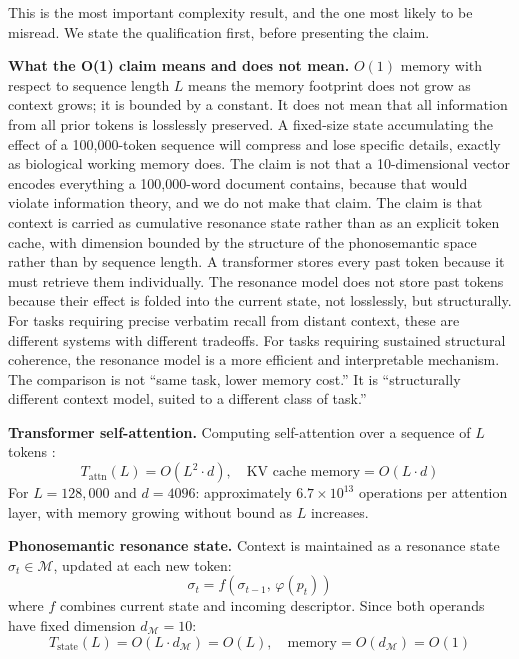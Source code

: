 \documentclass[12pt]{article}
\begin{document}
This is the most important complexity result, and the one most likely to be misread. We state the qualification first, before presenting the claim.

\textbf{What the O(1) claim means and does not mean.} $O(1)$ memory with respect to sequence length $L$ means the memory footprint does not grow as context grows; it is bounded by a constant. It does not mean that all information from all prior tokens is losslessly preserved. A fixed-size state accumulating the effect of a 100,000-token sequence will compress and lose specific details, exactly as biological working memory does. The claim is not that a 10-dimensional vector encodes everything a 100,000-word document contains, because that would violate information theory, and we do not make that claim. The claim is that context is carried as cumulative resonance state rather than as an explicit token cache, with dimension bounded by the structure of the phonosemantic space rather than by sequence length. A transformer stores every past token because it must retrieve them individually. The resonance model does not store past tokens because their effect is folded into the current state, not losslessly, but structurally. For tasks requiring precise verbatim recall from distant context, these are different systems with different tradeoffs. For tasks requiring sustained structural coherence, the resonance model is a more efficient and interpretable mechanism. The comparison is not ``same task, lower memory cost.'' It is ``structurally different context model, suited to a different class of task.''

\textbf{Transformer self-attention.}
Computing self-attention over a sequence of $L$ tokens \cite{vaswani2017}:
\[
T_\text{attn}(L) = O(L^2 \cdot d), \quad \text{KV cache memory} = O(L \cdot d)
\]
For $L = 128{,}000$ and $d = 4096$: approximately $6.7 \times 10^{13}$ operations per attention layer, with memory growing without bound as $L$ increases.

\textbf{Phonosemantic resonance state.}
Context is maintained as a resonance state $\sigma_t \in \mathcal{M}$, updated at each new token:
\[
\sigma_t = f(\sigma_{t-1},\, \varphi(p_t))
\]
where $f$ combines current state and incoming descriptor. Since both operands have fixed dimension $d_\mathcal{M} = 10$:
\[
T_\text{state}(L) = O(L \cdot d_\mathcal{M}) = O(L), \quad \text{memory} = O(d_\mathcal{M}) = O(1)
\]
\end{document}
